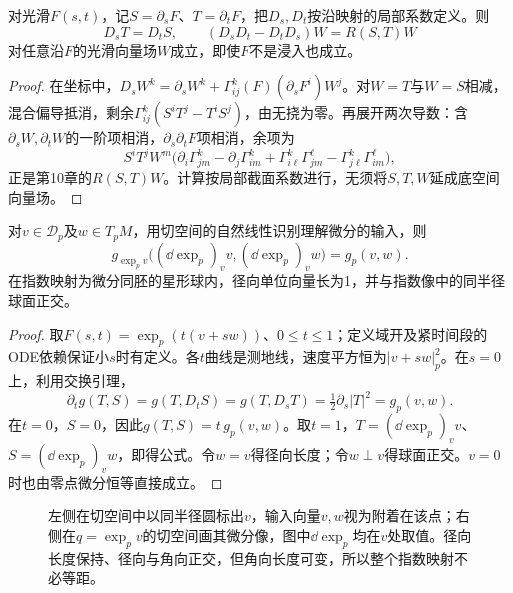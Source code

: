 \begin{lemma}[二维参数的导数交换]\label{lem:variation-commutation}
对光滑$F(s,t)$，记$S=\partial_sF$、$T=\partial_tF$，把$D_s,D_t$按沿映射的局部系数定义。则
\[
 D_sT=D_tS,\qquad (D_sD_t-D_tD_s)W=R(S,T)W
\]
对任意沿$F$的光滑向量场$W$成立，即使$F$不是浸入也成立。
\end{lemma}
\begin{proof}
在坐标中，$D_sW^k=\partial_sW^k+\Gamma^k_{ij}(F)(\partial_sF^i)W^j$。对$W=T$与$W=S$相减，混合偏导抵消，剩余$\Gamma^k_{ij}(S^iT^j-T^iS^j)$，由无挠为零。再展开两次导数：含$\partial_sW,\partial_tW$的一阶项相消，$\partial_s\partial_tF$项相消，余项为
\[
 S^iT^jW^m\bigl(\partial_i\Gamma^k_{jm}-\partial_j\Gamma^k_{im}
 +\Gamma^k_{i\ell}\Gamma^\ell_{jm}-\Gamma^k_{j\ell}\Gamma^\ell_{im}\bigr),
\]
正是第10章的$R(S,T)W$。计算按局部截面系数进行，无须将$S,T,W$延成底空间向量场。
\end{proof}

\begin{theorem}[Gauss引理]\label{thm:gauss-lemma}
对$v\in\mathcal D_p$及$w\in T_pM$，用切空间的自然线性识别理解微分的输入，则
\[
 g_{\exp_pv}\bigl((\dd\exp_p)_v v,(\dd\exp_p)_v w\bigr)=g_p(v,w).
\]
在指数映射为微分同胚的星形球内，径向单位向量长为1，并与指数像中的同半径球面正交。
\end{theorem}
\begin{proof}
取$F(s,t)=\exp_p(t(v+sw))$、$0\leq t\leq1$；定义域开及紧时间段的ODE依赖保证小$s$时有定义。各$t$曲线是测地线，速度平方恒为$|v+sw|_p^2$。在$s=0$上，利用交换引理，
\[
 \partial_t g(T,S)=g(T,D_tS)=g(T,D_sT)
 =\tfrac12\partial_s|T|^2=g_p(v,w).
\]
在$t=0$，$S=0$，因此$g(T,S)=t\,g_p(v,w)$。取$t=1$，$T=(\dd\exp_p)_v v$、$S=(\dd\exp_p)_v w$，即得公式。令$w=v$得径向长度；令$w\perp v$得球面正交。$v=0$时也由零点微分恒等直接成立。
\end{proof}

\begin{figure}[htbp]
\centering
\caption{左侧在切空间中以同半径圆标出$v$，输入向量$v,w$视为附着在该点；右侧在$q=\exp_pv$的切空间画其微分像，图中$\dd\exp_p$均在$v$处取值。径向长度保持、径向与角向正交，但角向长度可变，所以整个指数映射不必等距。}
\label{fig:gauss-radial}
\end{figure}

